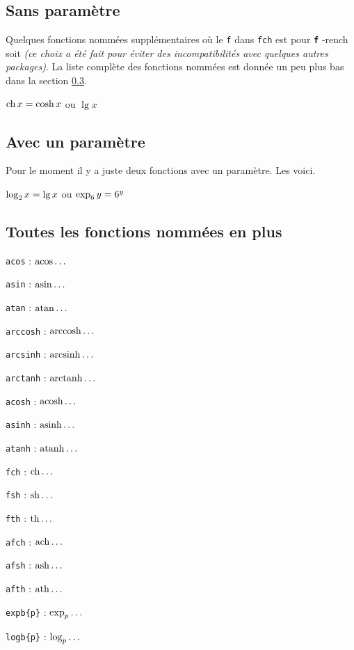 \documentclass[12pt,a4paper]{article}
\makeatletter
\theoremstyle{definition}
\newcommand\whyprefix[2]{%
	\textbf{\prefix{#1}}-#2%
}
\newcommand\prefix[1]{%
	\texttt{#1}%
}
\newcommand\inenglish{\@ifstar{\@inenglish@star}{\@inenglish@no@star}}
\newcommand\@inenglish@star[1]{%
	\emph{\og #1 \fg}%
}
\newcommand\@inenglish@no@star[1]{%
	\@inenglish@star{#1} en anglais%
}
\makeatother
\begin{document}
\subsection{Sans paramètre}

Quelques fonctions nommées supplémentaires où le \prefix{f} dans \prefix{fch} est pour \whyprefix{f}{rench} soit \inenglish{français} \emph{(ce choix a été fait pour éviter des incompatibilités avec quelques autres packages)}. La liste complète des fonctions nommées est donnée un peu plus bas dans la section  \ref{tnsana-all-named-functions}.

\begin{latexex}
$\operatorname{\operatorname{ch}} x = \cosh x$ ou
$\lg x$
\end{latexex}




\subsection{Avec un paramètre}

Pour le moment il y a juste deux fonctions avec un paramètre. Les voici.

\begin{latexex}
$\log_{2} x = \lg x$ ou
$\exp_{6} y = 6^y$
\end{latexex}




\subsection{Toutes les fonctions nommées en plus} \label{tnsana-all-named-functions}

\vspace{-1em}

\begin{multicols}{2}
    \verb+acos+ : $\operatorname{\operatorname{acos}}\dots$

    \verb+asin+ : $\operatorname{\operatorname{asin}}\dots$

    \verb+atan+ : $\operatorname{\operatorname{atan}}\dots$

    \verb+arccosh+ : $\operatorname{\operatorname{arccosh}}\dots$

    \verb+arcsinh+ : $\operatorname{\operatorname{arcsinh}}\dots$

    \verb+arctanh+ : $\operatorname{\operatorname{arctanh}}\dots$

    \verb+acosh+ : $\operatorname{\operatorname{acosh}}\dots$

    \verb+asinh+ : $\operatorname{\operatorname{asinh}}\dots$

    \verb+atanh+ : $\operatorname{\operatorname{atanh}}\dots$

    \verb+fch+ : $\operatorname{\operatorname{ch}}\dots$

    \verb+fsh+ : $\operatorname{\operatorname{sh}}\dots$

    \verb+fth+ : $\operatorname{\operatorname{th}}\dots$

    \verb+afch+ : $\operatorname{\operatorname{ach}}\dots$

    \verb+afsh+ : $\operatorname{\operatorname{ash}}\dots$

    \verb+afth+ : $\operatorname{\operatorname{ath}}\dots$

    \verb+expb{p}+ : $\exp_{p}\dots$

    \verb+logb{p}+ : $\log_{p}\dots$
\end{multicols}
\end{document}
